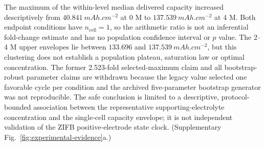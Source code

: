 \documentclass[11pt]{article}
\begin{document}
\begin{sloppypar}
The maximum of the within-level median delivered capacity increased descriptively from
$40.841~\si{mAh.cm^{-2}}$ at 0 M to $137.539~\si{mAh.cm^{-2}}$ at 4 M. Both endpoint conditions have
$n_{\mathrm{cell}}=1$, so the arithmetic ratio is not an inferential fold-change estimate and has no
population confidence interval or $p$ value. The 2--4 M upper envelopes lie between $133.696$ and
$137.539~\si{mAh.cm^{-2}}$, but this clustering does not establish a population plateau, saturation law or
optimal concentration. The former 2.523-fold selected-maximum claim and all bootstrap-robust parameter claims
are withdrawn because the legacy value selected one favorable cycle per condition and the archived
five-parameter bootstrap generator was not reproducible. The safe conclusion is limited to a descriptive,
protocol-bounded association between the representative supporting-electrolyte concentration and the
single-cell capacity envelope; it is not independent validation of the ZIFB positive-electrode state clock.
(Supplementary Fig.~\ref{fig:experimental-evidence}a.)
\end{sloppypar}
\end{document}
